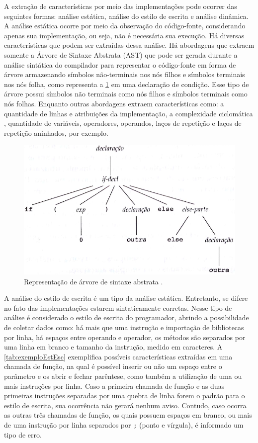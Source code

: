 			A extração de características por meio das implementações pode ocorrer das
			seguintes formas: análise estática, análise do estilo de escrita e análise dinâmica.
			A análise estática ocorre por meio da observação do código-fonte, considerando
			apenas sua implementação, ou seja, não é necessária sua execução. Há diversas
			características que podem ser extraídas dessa análise. Há abordagens que extraem
			somente a Árvore de Sintaxe Abstrata (AST) que pode ser gerada durante a análise
			sintática do compilador para representar o código-fonte em forma de árvore
			armazenando símbolos não-terminais nos nós filhos e símbolos terminais nos
			nós folha, como representa a \cref{fig:AST} em uma declaração de condição.
			Esse tipo de árvore possui símbolos não terminais como nós filhos
			e símbolos terminais como nós folhas. Enquanto outras abordagens extraem
			características como: a quantidade de linhas e atribuições da implementação,
			a complexidade ciclomática \cite{mccabe}, quantidade de variáveis, operadores,
			operandos, laços de repetição e laços de repetição aninhados, por exemplo.
						
			\begin{figure}[h]
				\centering
				\includegraphics[width=0.7\linewidth]{imagem/AST}
				\caption[Representação de árvore de sintaxe abstrata]{Representação de árvore de sintaxe abstrata \cite{louden2004}.}
				\label{fig:AST}
			\end{figure}
			
			A análise do estilo de escrita é um tipo da análise estática. Entretanto,
			se difere no fato das implementações estarem sintaticamente corretas. Nesse
			tipo de análise é considerado o estilo de escrita do programador, abrindo a
			possibilidade de coletar dados como: há mais que uma instrução e importação
			de bibliotecas por linha, há espaços entre operando e operador, os métodos
			são separados por uma linha em branco e tamanho da instrução, medido em
			caracteres. A \cref{tab:exemploEstEsc} exemplifica possíveis características
			extraídas em uma chamada de função, na qual é possível inserir ou não um
			espaço entre o parâmetro e os  abrir e fechar parêntese,
			como também a utilização de uma ou mais instruções por linha. Caso a primeira
			chamada de função e as duas primeiras instruções separadas por uma quebra de linha
			forem o padrão para o estilo de escrita, sua ocorrência não gerará nenhum
			aviso. Contudo, caso ocorra as outras três chamadas de função, os quais
			possuem espaços em branco, ou mais de uma instrução por linha separados
			por \texttt{;} (ponto e vírgula), é informado um tipo de erro.
			

